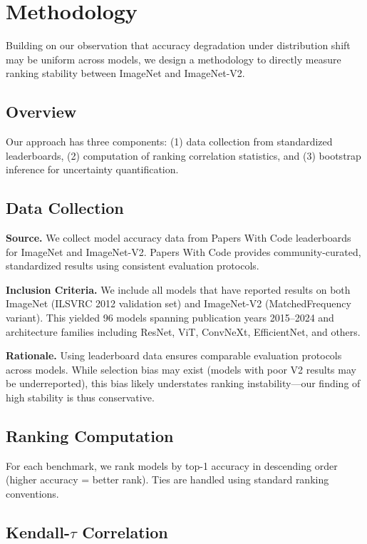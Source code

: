 \section{Methodology}
\label{sec:methodology}

Building on our observation that accuracy degradation under distribution shift may be uniform across models, we design a methodology to directly measure ranking stability between ImageNet and ImageNet-V2.

\subsection{Overview}

Our approach has three components: (1) data collection from standardized leaderboards, (2) computation of ranking correlation statistics, and (3) bootstrap inference for uncertainty quantification.

\subsection{Data Collection}

\textbf{Source.} We collect model accuracy data from Papers With Code leaderboards for ImageNet and ImageNet-V2. Papers With Code provides community-curated, standardized results using consistent evaluation protocols.

\textbf{Inclusion Criteria.} We include all models that have reported results on both ImageNet (ILSVRC 2012 validation set) and ImageNet-V2 (MatchedFrequency variant). This yielded 96 models spanning publication years 2015--2024 and architecture families including ResNet, ViT, ConvNeXt, EfficientNet, and others.

\textbf{Rationale.} Using leaderboard data ensures comparable evaluation protocols across models. While selection bias may exist (models with poor V2 results may be underreported), this bias likely understates ranking instability---our finding of high stability is thus conservative.

\subsection{Ranking Computation}

For each benchmark, we rank models by top-1 accuracy in descending order (higher accuracy = better rank). Ties are handled using standard ranking conventions.

\subsection{Kendall-$\tau$ Correlation}

